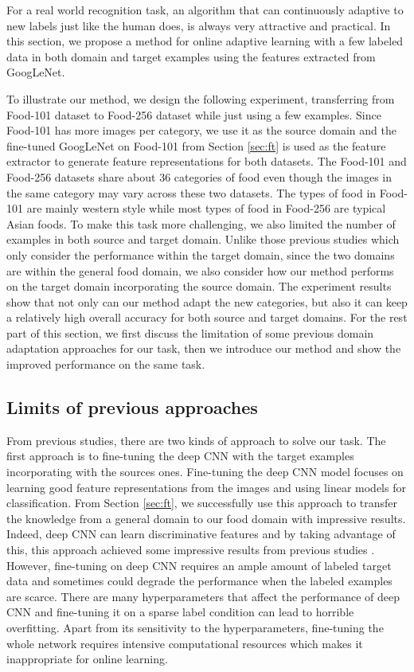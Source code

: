 ﻿For a real world recognition task, an algorithm that can continuously adaptive to new labels just like the human does, is always very attractive and practical.
In this section, we propose a method for online adaptive learning with a few labeled data in both domain and target examples using the features extracted from GoogLeNet. 

 To illustrate our method, we design the following experiment, transferring from Food-101 dataset to Food-256 dataset while just using a few examples. Since Food-101 has more images per category, we use it as the source domain and the fine-tuned GoogLeNet on Food-101 from Section \ref{sec:ft} is used as the feature extractor to generate feature representations for both datasets. The Food-101 and Food-256 datasets share about 36 categories of food even though the images in the same category may vary across these two datasets. The types of food in Food-101 are mainly western style while most types of food in Food-256 are typical Asian foods. To make this task more challenging, we also limited the number of examples in both source and target domain. Unlike those previous studies which only consider the performance within the target domain, since the two domains are within the general food domain, we also consider how our method performs on the target domain incorporating the source domain. The experiment results show that not only can our method adapt the new categories, but also it can keep a relatively high overall accuracy for both source and target domains.
For the rest part of this section, we first discuss the limitation of some previous domain adaptation approaches for our task, then we introduce our method and show the improved performance on the same task.
\subsection{Limits of previous approaches}
From previous studies, there are two kinds of approach to solve our task. The first approach is to fine-tuning the deep CNN with the target examples incorporating with the sources ones.
Fine-tuning the deep CNN model focuses on learning good feature representations from the images and using linear models for classification. From Section \ref{sec:ft}, we successfully use this approach to transfer the knowledge from a general domain to our food domain with impressive results. Indeed, deep CNN can learn discriminative features and by taking advantage of this, this approach achieved some impressive results from previous studies\cite{Chatfield14} \cite{zeiler2014visualizing}. However, fine-tuning on deep CNN requires an ample amount of labeled target data and sometimes could degrade the performance when the labeled examples are scarce\cite{hoffman2013one}. There are many hyperparameters that affect the performance of deep CNN and fine-tuning it on a sparse label condition can lead to horrible overfitting. Apart from its sensitivity to the hyperparameters, fine-tuning the whole network requires intensive computational resources which makes it inappropriate for online learning.

